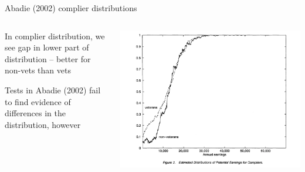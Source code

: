 \documentclass[notes,11pt, aspectratio=169]{beamer}
\newenvironment{wideitemize}{\itemize\addtolength{\itemsep}{10pt}}{\enditemize}
\begin{document}
\begin{frame}{Abadie (2002) complier distributions}
  \begin{columns}[T] %
    \begin{column}{0.3\textwidth}
      \begin{wideitemize}
      \item In complier distribution, we see gap in lower part of
        distribution -- better for non-vets than vets
      \item Tests in Abadie (2002) fail to find evidence of
        differences in the distribution, however
      \end{wideitemize}
\end{column}
\begin{column}{0.7\textwidth}
  \begin{center}
    \includegraphics[width=\linewidth]{images/abadie_kappa2.png}
  \end{center}
\end{column}
\end{columns}
\end{frame}
\end{document}
